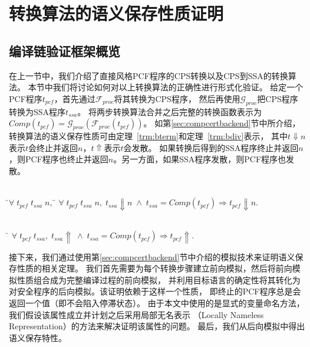
\chapter{转换算法的语义保存性质证明} \label{ch:verify}

\section{编译链验证框架概览}

在上一节中，我们介绍了直接风格PCF程序的CPS转换以及CPS到SSA的转换算法。
本节中我们将讨论如何对以上转换算法的正确性进行形式化验证。
给定一个PCF程序$t_{pcf}$，首先通过$\mathcal{F}_{proc}$将其转换为CPS程序，
然后再使用$\mathcal{G}_{proc}$把CPS程序转换为SSA程序$t_{ssa}$。
将两步转换算法合并之后完整的转换函数表示为$Comp(t_{pcf}) = \mathcal{G}_{proc}(\mathcal{F}_{proc}(t_{pcf}))$。
如第\ref{sec:compcertbackend}节中所介绍，转换算法的语义保存性质可由定理~\ref{trm:bterm}和定理~\ref{trm:bdiv}表示，
其中$t \Downarrow n$表示$t$会终止并返回$n$，$t \Uparrow$表示$t$会发散。
如果转换后得到的SSA程序终止并返回$n$，则PCF程序也终止并返回$n$。另一方面，如果SSA程序发散，则PCF程序也发散。

\begin{theorem}[程序终止行为的保存]\label{trm:bterm} 
    \begin{tabbing}
     \\
    \quad\=$\forall \; t_{pcf}\; t_{ssa}\; n,\; $\=\kill
    \>$\forall \; t_{pcf}\; t_{ssa}\; n,\; t_{ssa}\Downarrow n\; \wedge \; t_{ssa}=Comp(t_{pcf}) \Longrightarrow t_{pcf}\Downarrow n.$
    \end{tabbing}
  \end{theorem}
  
  \begin{theorem}[程序发散行为的保存]\label{trm:bdiv}
    \begin{tabbing}
      \\
    \quad\=\kill
    \>$\forall \; t_{pcf}\; t_{ssa},\; t_{ssa}\Uparrow\; \wedge \; t_{ssa}=Comp(t_{pcf})\Longrightarrow t_{pcf}\Uparrow.$
    \end{tabbing}
  \end{theorem}

接下来，我们通过使用第\ref{sec:compcertbackend}节中介绍的模拟技术来证明语义保存性质的相关定理。
我们首先需要为每个转换步骤建立前向模拟，然后将前向模拟性质组合成为完整编译过程的前向模拟，
并利用目标语言的确定性将其转化为对安全程序的后向模拟。该证明依赖于这样一个性质，
即终止的PCF程序总是会返回一个值（即不会陷入停滞状态）。
由于本文中使用的是显式的变量命名方法，我们假设该属性成立并计划之后采用局部无名表示
（Locally Nameless Representation）的方法来解决证明该属性的问题。
最后，我们从后向模拟中得出语义保存特性。

